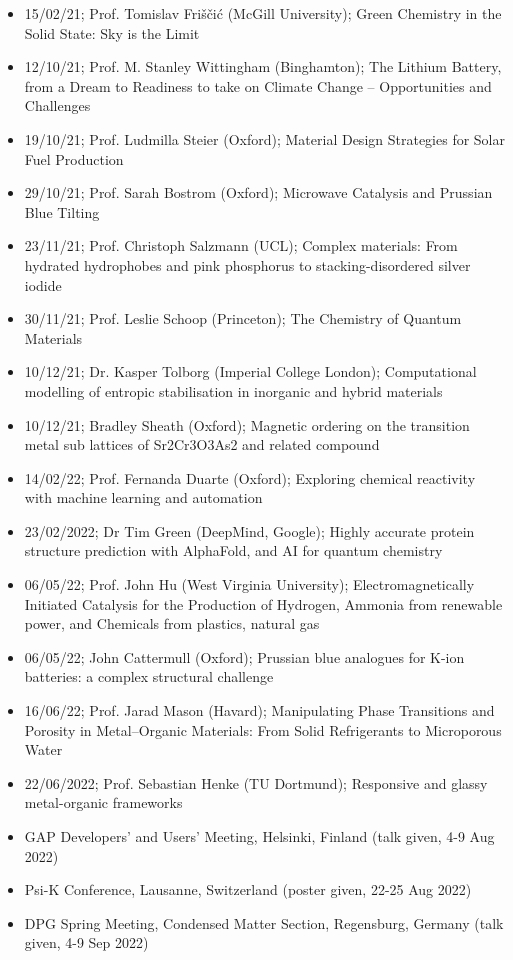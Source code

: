 \documentclass[12pt,a4paper,twoside,nobind]{ociamthesis}
\begin{document}
\begin{itemize}
  \item 15/02/21; Prof. Tomislav Friščić (McGill University); Green Chemistry in the Solid State: Sky is the Limit
  \item 12/10/21;	Prof. M. Stanley Wittingham (Binghamton);	The Lithium Battery, from a Dream to Readiness to take on Climate Change – Opportunities and Challenges
  \item 19/10/21;	Prof. Ludmilla Steier (Oxford);	Material Design Strategies for Solar Fuel Production
  \item 29/10/21;	Prof. Sarah Bostrom (Oxford);	Microwave Catalysis and Prussian Blue Tilting
  \item 23/11/21;	Prof. Christoph Salzmann (UCL);	Complex materials: From hydrated hydrophobes and pink phosphorus to stacking-disordered silver iodide
  \item 30/11/21;	Prof. Leslie Schoop (Princeton);	The Chemistry of Quantum Materials
  \item 10/12/21; Dr. Kasper Tolborg (Imperial College London); Computational modelling of entropic stabilisation in inorganic and hybrid materials
  \item 10/12/21; Bradley Sheath (Oxford); Magnetic ordering on the transition metal sub lattices of Sr2Cr3O3As2 and related compound
  \item 14/02/22;	Prof. Fernanda Duarte (Oxford);	Exploring chemical reactivity with machine learning and automation
  \item 23/02/2022; Dr Tim Green (DeepMind, Google); Highly accurate protein structure prediction with AlphaFold, and AI for quantum chemistry
  \item 06/05/22; Prof. John Hu (West Virginia University); Electromagnetically Initiated Catalysis for the Production of Hydrogen, Ammonia from renewable power, and Chemicals from plastics, natural gas
  \item 06/05/22; John Cattermull (Oxford); Prussian blue analogues for K-ion batteries: a complex structural challenge
  \item 16/06/22; Prof. Jarad Mason (Havard); Manipulating Phase Transitions and Porosity in Metal–Organic Materials: From Solid Refrigerants to Microporous Water
  \item 22/06/2022; Prof. Sebastian Henke (TU Dortmund); Responsive and glassy metal-organic frameworks
  \item GAP Developers' and Users' Meeting, Helsinki, Finland (talk given, 4-9 Aug 2022)
  \item Psi-K Conference, Lausanne, Switzerland (poster given, 22-25 Aug 2022)
  \item DPG Spring Meeting, Condensed Matter Section, Regensburg, Germany (talk given, 4-9 Sep 2022)
\end{itemize}
\end{document}
